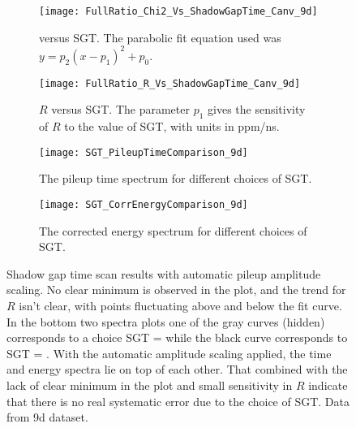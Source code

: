 \begin{figure}
\centering
    \begin{subfigure}[t]{0.45\textwidth}
        \centering
        \texttt{[image: FullRatio\_Chi2\_Vs\_ShadowGapTime\_Canv\_9d]}
        \caption{\chisq versus SGT. The parabolic fit equation used was $y = p_{2}(x - p_{1})^{2} + p_{0}.$}
    \end{subfigure}%
    \hspace{1cm}
    \begin{subfigure}[t]{0.45\textwidth}
        \centering
        \texttt{[image: FullRatio\_R\_Vs\_ShadowGapTime\_Canv\_9d]}
        \caption{$R$ versus SGT. The parameter $p_{1}$ gives the sensitivity of $R$ to the value of SGT, with units in ppm/ns.}
    \end{subfigure}

    \begin{subfigure}[t]{0.45\textwidth}
        \centering
        \texttt{[image: SGT\_PileupTimeComparison\_9d]}
        \caption{The pileup time spectrum for different choices of SGT.}
    \end{subfigure}%
    \hspace{1cm}
    \begin{subfigure}[t]{0.45\textwidth}
        \centering
        \texttt{[image: SGT\_CorrEnergyComparison\_9d]}
        \caption{The corrected energy spectrum for different choices of SGT.}
    \end{subfigure}
\caption[Pileup shadow gap time scan with automatic pileup amplitude scaling]{Shadow gap time scan results with automatic pileup amplitude scaling. No clear minimum is observed in the \chisq plot, and the trend for $R$ isn't clear, with points fluctuating above and below the fit curve. In the bottom two spectra plots one of the gray curves (hidden) corresponds to a choice SGT =  while the black curve corresponds to SGT = . With the automatic amplitude scaling applied, the time and energy spectra lie on top of each other. That combined with the lack of clear minimum in the \chisq plot and small sensitivity in $R$ indicate that there is no real systematic error due to the choice of SGT. Data from 9d dataset.}
\label{fig:SGTscan}
\end{figure}


